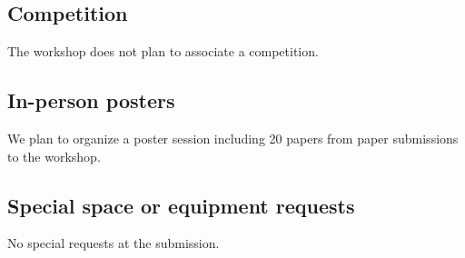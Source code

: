 \documentclass{article}
\begin{document}
\subsection{Competition}
The workshop does not plan to associate a competition.

\subsection{In-person posters}
We plan to organize a poster session including 20 papers from paper submissions to the workshop.

\subsection{Special space or equipment requests}
No special requests at the submission.
\end{document}
